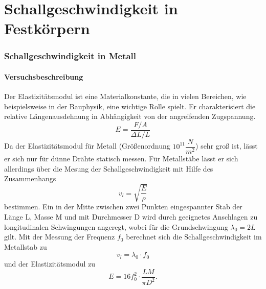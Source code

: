 \documentclass[12pt,a4paper]{article}
\author{Moritz}
\begin{document}
\part{Schallgeschwindigkeit in Festkörpern}
\section{Schallgeschwindigkeit in Metall}
\subsection{Versuchsbeschreibung}
Der Elastizitätsmodul ist eine Materialkonstante, die in vielen Bereichen, wie beispielsweise in der Bauphysik, eine wichtige Rolle spielt. Er charakterisiert die relative Längenausdehnung in Abhängigkeit von der angreifenden Zugspannung.
\begin{equation}
E = \dfrac{F/A}{\Delta L/L}
\end{equation}
Da der Elastizitätsmodul für Metall (Größenordnung $10^{11} \dfrac{N}{m^2}$) sehr groß ist, lässt er sich nur für dünne Drähte statisch messen. Für Metallstäbe lässt er sich allerdings über die Mesung der Schallgeschwindigkeit mit Hilfe des Zusammenhangs 
\begin{equation}
v_l = \sqrt{\dfrac{E}{\rho}}
\label{eq:001}
\end{equation}
bestimmen. Ein in der Mitte zwischen zwei Punkten eingespannter Stab der Länge L, Masse M und mit Durchmesser D wird durch geeignetes Anschlagen zu longitudinalen Schwingungen angeregt, wobei für die Grundschwingung $\lambda_0 = 2L$ gilt. Mit der Messung der Frequenz $f_0$ berechnet sich die Schallgeschwindigkeit im Metallstab zu
\begin{equation}
v_l = \lambda_0 \cdot f_0
\label{eq:002}
\end{equation}
und der Elastizitätsmodul zu
\begin{equation}
E = 16 f_0^2 \cdot \dfrac{L M}{\pi D^2}.
\label{eq:003}
\end{equation}
\end{document}
